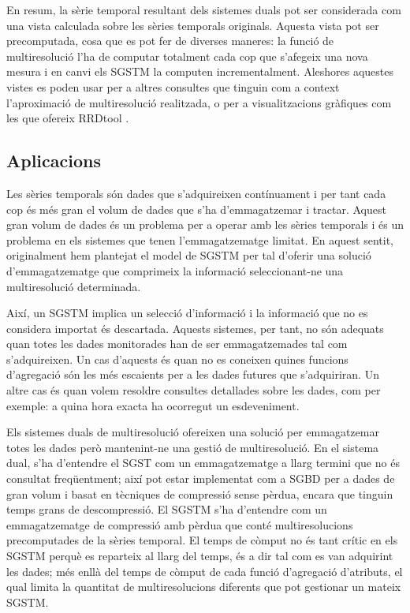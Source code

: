 En resum, la sèrie temporal resultant dels sistemes duals pot ser
considerada com una vista calculada sobre les sèries temporals
originals. Aquesta vista pot ser precomputada, cosa que es pot fer de
diverses maneres: la funció de multiresolució l'ha de computar
totalment cada cop que s'afegeix una nova mesura i en canvi els
\gls{SGSTM} la computen incrementalment.  Aleshores aquestes vistes es
poden usar per a altres consultes que tinguin com a context
l'aproximació de multiresolució realitzada, o per a visualitzacions
gràfiques com les que ofereix RRDtool \cite{rrdtool}.




\subsection{Aplicacions}


Les sèries temporals són dades que s'adquireixen contínuament i per
tant cada cop és més gran el volum de dades que s'ha d'emmagatzemar i
tractar. Aquest gran volum de dades és un problema per a operar amb
les sèries temporals i és un problema en els sistemes que tenen
l'emmagatzematge limitat. En aquest sentit, originalment hem
plantejat el model de \gls{SGSTM} per tal d'oferir una solució
d'emmagatzematge que comprimeix la informació seleccionant-ne una
multiresolució determinada.


Així, un \gls{SGSTM} implica un selecció d'informació i la informació
que no es considera importat és descartada. Aquests sistemes, per
tant, no són adequats quan totes les dades monitorades han de ser
emmagatzemades tal com s'adquireixen. Un cas d'aquests és quan no es
coneixen quines funcions d'agregació són les més escaients per a les
dades futures que s'adquiriran. Un altre cas és quan volem resoldre
consultes detallades sobre les dades, com per exemple: a quina hora
exacta ha ocorregut un esdeveniment.


Els sistemes duals de multiresolució ofereixen una solució per
emmagatzemar totes les dades però mantenint-ne una gestió de
multiresolució.  En el sistema dual, s'ha d'entendre el \gls{SGST} com
un emmagatzematge a llarg termini que no és consultat freqüentment;
així pot estar implementat com a \gls{SGBD} per a dades de gran volum
i basat en tècniques de compressió sense pèrdua, encara que tinguin
temps grans de descompressió. El \gls{SGSTM} s'ha d'entendre com un
emmagatzematge de compressió amb pèrdua que conté multiresolucions
precomputades de la sèries temporal.  El temps de còmput no és tant
crític en els \gls{SGSTM} perquè es reparteix al llarg del temps, és a
dir tal com es van adquirint les dades; més enllà del temps de còmput
de cada funció d'agregació d'atributs, el qual limita la quantitat de
multiresolucions diferents que pot gestionar un mateix \gls{SGSTM}.


